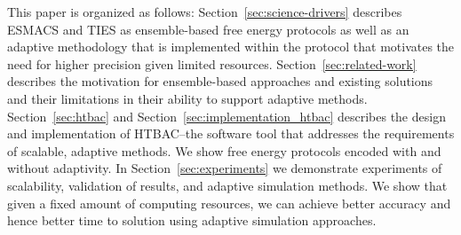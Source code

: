 This paper is organized as follows: 
Section~\ref{sec:science-drivers} describes ESMACS and TIES as ensemble-based 
free energy protocols as well as an adaptive methodology that is implemented 
within the protocol that motivates the need for higher precision given limited 
resources. 
Section~\ref{sec:related-work} describes the motivation for ensemble-based 
approaches and existing solutions and their limitations in their ability to 
support adaptive methods.  
Section~\ref{sec:htbac} and Section~\ref{sec:implementation_htbac} describes the 
design and implementation of HTBAC--the software tool that addresses the 
requirements of scalable, adaptive methods. We show free energy protocols 
encoded with and without adaptivity. 
In Section~\ref{sec:experiments} we demonstrate experiments of scalability, 
validation of results, and adaptive simulation methods. We show that given a 
fixed amount of computing resources, we can achieve better accuracy and hence 
better time to solution using adaptive simulation approaches. 





